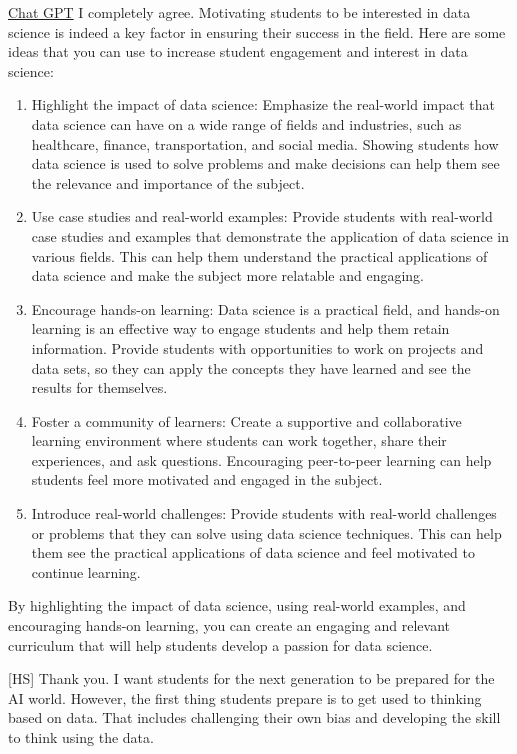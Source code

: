 \documentclass[
]{bxjsbook}
\providecommand{\tightlist}{%
  \setlength{\itemsep}{0pt}\setlength{\parskip}{0pt}}
\theoremstyle{definition}
\theoremstyle{definition}
\theoremstyle{definition}
\theoremstyle{definition}
\theoremstyle{remark}
\begin{document}
\protect\hyperlink{chatgpt}{Chat GPT} I completely agree. Motivating students to be interested in data science is indeed a key factor in ensuring their success in the field. Here are some ideas that you can use to increase student engagement and interest in data science:

\begin{enumerate}
\def\labelenumi{\arabic{enumi}.}
\tightlist
\item
  Highlight the impact of data science: Emphasize the real-world impact that data science can have on a wide range of fields and industries, such as healthcare, finance, transportation, and social media. Showing students how data science is used to solve problems and make decisions can help them see the relevance and importance of the subject.
\item
  Use case studies and real-world examples: Provide students with real-world case studies and examples that demonstrate the application of data science in various fields. This can help them understand the practical applications of data science and make the subject more relatable and engaging.
\item
  Encourage hands-on learning: Data science is a practical field, and hands-on learning is an effective way to engage students and help them retain information. Provide students with opportunities to work on projects and data sets, so they can apply the concepts they have learned and see the results for themselves.
\item
  Foster a community of learners: Create a supportive and collaborative learning environment where students can work together, share their experiences, and ask questions. Encouraging peer-to-peer learning can help students feel more motivated and engaged in the subject.
\item
  Introduce real-world challenges: Provide students with real-world challenges or problems that they can solve using data science techniques. This can help them see the practical applications of data science and feel motivated to continue learning.
\end{enumerate}

By highlighting the impact of data science, using real-world examples, and encouraging hands-on learning, you can create an engaging and relevant curriculum that will help students develop a passion for data science.

{[}HS{]} Thank you. I want students for the next generation to be prepared for the AI world. However, the first thing students prepare is to get used to thinking based on data. That includes challenging their own bias and developing the skill to think using the data.
\end{document}
